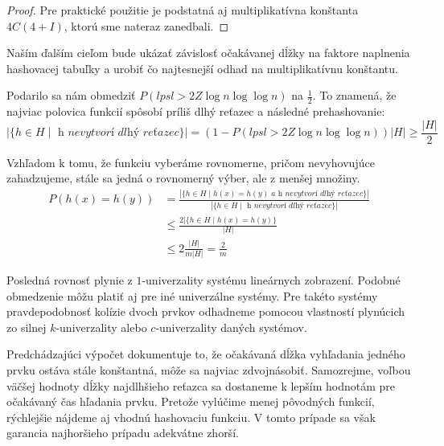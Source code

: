 \begin{proof}
Pre praktické použitie je podstatná aj multiplikatívna konštanta $4C(4 + I)$, ktorú sme nateraz zanedbali.
\end{proof}

Naším ďalším cieľom bude ukázať závislosť očakávanej dĺžky na faktore naplnenia hashovacej tabuľky a urobiť čo najtesnejší odhad na multiplikatívnu konštantu.

Podarilo sa nám obmedziť $P(lpsl > 2Z \log n \log \log n)$ na $\frac{1}{2}$. To znamená, že najviac polovica funkcií spôsobí príliš dlhý reťazec a následné prehashovanie:
\begin{displaymath}
|\lbrace h \in H \mid \textit{ h nevytvorí dlhý reťazec} \rbrace| = \left(1 - P(lpsl > 2Z \log n \log \log n)\right) |H| \geq \frac{|H|}{2}
\end{displaymath}

Vzhľadom k tomu, že funkciu vyberáme rovnomerne, pričom nevyhovujúce zahadzujeme, stále sa jedná o rovnomerný výber, ale z menšej množiny.
\begin{displaymath}
\begin{split}
P(h(x) = h(y)) 
	& =  \frac{|\lbrace h \in H \mid h(x) = h(y) \textit{ a h nevytvorí dlhý reťazec} \rbrace |}{|\lbrace h \in H \mid \textit{ h nevytvorí dlhý reťazec} \rbrace|} \\
	& \leq \frac{2 |\lbrace h \in H \mid h(x) = h(y) \rbrace}{|H|} \\
	& \leq 2 \frac{|H|}{m |H|} = \frac{2}{m}
\end{split}
\end{displaymath}

Posledná rovnosť plynie z $1$-univerzality systému lineárnych zobrazení. Podobné obmedzenie môžu platiť aj pre iné univerzálne systémy. Pre takéto systémy pravdepodobnosť kolízie dvoch prvkov odhadneme pomocou vlastností plynúcich zo silnej $k$-univerzality alebo $c$-univerzality daných systémov.

Predchádzajúci výpočet dokumentuje to, že očakávaná dĺžka vyhľadania jedného prvku ostáva stále konštantná, môže sa najviac zdvojnásobiť. Samozrejme, voľbou väčšej hodnoty dĺžky najdlhšieho reťazca sa dostaneme k lepším hodnotám pre očakávaný čas hľadania prvku. Pretože vylúčime menej pôvodných funkcií, rýchlejšie nájdeme aj vhodnú hashovaciu funkciu. V tomto prípade sa však garancia najhoršieho prípadu adekvátne zhorší. 
